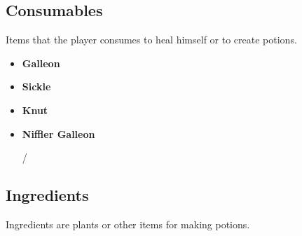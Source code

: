 \subsection{Consumables}
Items that the player consumes to heal himself or to create potions.
\begin{itemize}
 \item \textbf {Galleon}
 \item \textbf {Sickle}
 \item \textbf {Knut}
 \item \textbf {Niffler Galleon}

/
 \end{itemize}

\subsection{Ingredients}
Ingredients are plants or other items for making potions.

